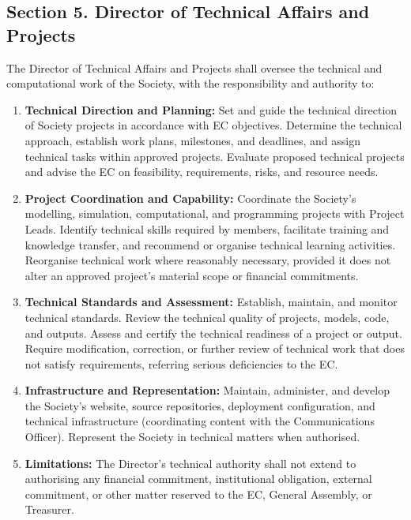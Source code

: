 \documentclass[a4paper]{article}
\begin{document}
\subsection*{Section 5. Director of Technical Affairs and Projects}
The Director of Technical Affairs and Projects shall oversee the technical and computational work of the Society, with the responsibility and authority to:
\begin{enumerate}
  \item \textbf{Technical Direction and Planning:} Set and guide the technical direction of Society projects in accordance with EC objectives. Determine the technical approach, establish work plans, milestones, and deadlines, and assign technical tasks within approved projects. Evaluate proposed technical projects and advise the EC on feasibility, requirements, risks, and resource needs.
  \item \textbf{Project Coordination and Capability:} Coordinate the Society's modelling, simulation, computational, and programming projects with Project Leads. Identify technical skills required by members, facilitate training and knowledge transfer, and recommend or organise technical learning activities. Reorganise technical work where reasonably necessary, provided it does not alter an approved project's material scope or financial commitments.
  \item \textbf{Technical Standards and Assessment:} Establish, maintain, and monitor technical standards. Review the technical quality of projects, models, code, and outputs. Assess and certify the technical readiness of a project or output. Require modification, correction, or further review of technical work that does not satisfy requirements, referring serious deficiencies to the EC.
  \item \textbf{Infrastructure and Representation:} Maintain, administer, and develop the Society's website, source repositories, deployment configuration, and technical infrastructure (coordinating content with the Communications Officer). Represent the Society in technical matters when authorised.
  \item \textbf{Limitations:} The Director's technical authority shall not extend to authorising any financial commitment, institutional obligation, external commitment, or other matter reserved to the EC, General Assembly, or Treasurer.
\end{enumerate}
\end{document}
